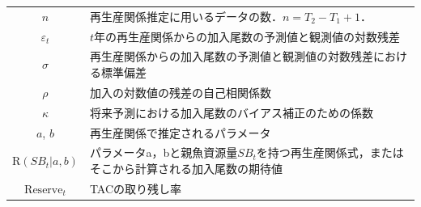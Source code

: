 \documentclass[11pt]{jsarticle}
\begin{document}
\begin{table}[h]
\begin{tabular}{cp{11cm}}
    $n$ & 再生産関係推定に用いるデータの数．$n=T_2-T_1+1$．\\    
    $\varepsilon_t$  & $t$年の再生産関係からの加入尾数の予測値と観測値の対数残差\\
    $\sigma$  & 再生産関係からの加入尾数の予測値と観測値の対数残差における標準偏差\\
    $\rho$  & 加入の対数値の残差の自己相関係数\\
    $\kappa$  & 将来予測における加入尾数のバイアス補正のための係数\\    
    $a$, $b$  & 再生産関係で推定されるパラメータ \\  %
    $\mathrm{R}(S\!B_{t}|a,b)$ &  パラメータa，bと親魚資源量$S\!B_{t}$を持つ再生産関係式，またはそこから計算される加入尾数の期待値　\\   
    $\mathrm{Reserve}_t$ & TACの取り残し率 \\ \hline
  \end{tabular}
  \label{table_definition} 
\end{table}
\end{document}
